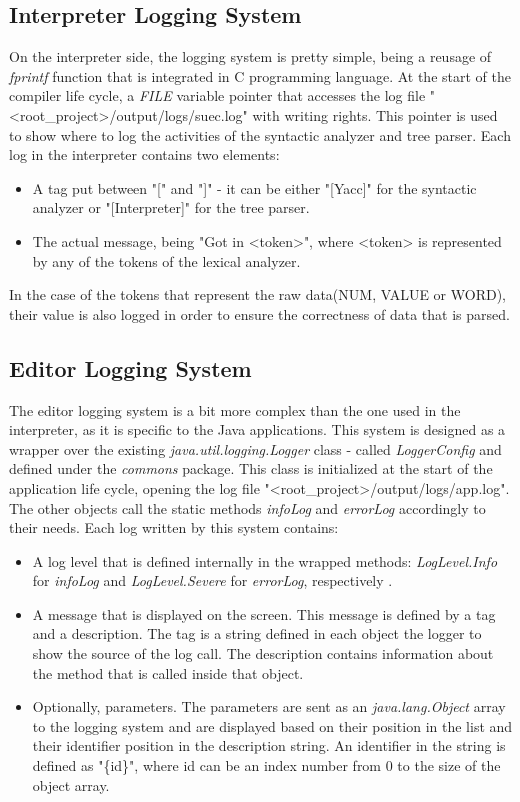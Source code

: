 \documentclass[12pt,a4paper,twoside]{report}
\begin{document}
\subsection{Interpreter Logging System}

On the interpreter side, the logging system is pretty simple, being a reusage of \textit{fprintf} function that is integrated in C programming language. At the start of the compiler life cycle, a \textit{FILE} variable pointer that accesses the log file "<root\_project>/output/logs/suec.log" with writing rights. This pointer is used to show where to log the activities of the syntactic analyzer and tree parser. Each log in the interpreter contains two elements:
\begin{itemize}
	\item A tag put between "[" and "]" - it can be either "[Yacc]" for the syntactic analyzer or "[Interpreter]" for the tree parser.
	\item The actual message, being "Got in <token>", where <token> is represented by any of the tokens of the lexical analyzer. 
\end{itemize} 

In the case of the tokens that represent the raw data(NUM, VALUE or WORD), their value is also logged in order to ensure the correctness of data that is parsed.


\subsection{Editor Logging System}

The editor logging system is a bit more complex than the one used in the interpreter, as it is specific to the Java applications. This system is designed as a wrapper over the existing \textit{java.util.logging.Logger} class - called \textit{LoggerConfig} and defined under the \textit{commons} package. This class is initialized at the start of the application life cycle, opening the log file  "<root\_project>/output/logs/app.log". The other objects call the static methods \textit{infoLog} and \textit{errorLog} accordingly to their needs. Each log written by this system contains:
\begin{itemize}
\item A log level that is defined internally in the wrapped methods: \textit{LogLevel.Info} for \textit{infoLog} and \textit{LogLevel.Severe} for \textit{errorLog}, respectively .
\item A message  that is displayed on the screen. This message is defined by a tag and a description. The tag is a string defined in each object the logger to show the source of the log call. The description contains information about the method that is called inside that object. 
\item Optionally, parameters. The parameters are sent as an \textit{java.lang.Object} array to the logging system and are displayed based on their position in the list and their identifier position in the description string. An identifier in the string is defined as "\{id\}", where id can be an index number from 0 to the size of the object array. 
\end{itemize}
\end{document}
